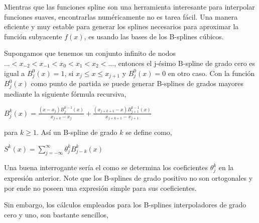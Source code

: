 \vspace{0.5cm}

\hspace{0.4cm} Mientras que las funciones spline son una herramienta interesante para interpolar funciones suaves, encontrarlas num\'ericamente no es tarea f\'acil. Una manera eficiente y muy estable para generar los splines necesarios para aproximar la funci\'on subyacente $f(x)$, es usando las bases de los B-splines c\'ubicos.

\vspace{0.5cm}

\hspace{0.4cm} Supongamos que tenemos un conjunto infinito de nodos $...<x_{-2}<x_{-1}<x_{0}<x_{1}<x_{2}<...$, entonces el j-\'esimo B-spline de grado cero es igual a $B^{0}_{j}(x)=1$, si $x_{j} \leq x \leq x_{j+1}$ y $B^{0}_{j}(x)=0$ en otro caso. Con la funci\'on $B^{0}_{j}(x)$ como punto de partida se puede generar B-splines de grados mayores mediante la siguiente f\'ormula recursiva,\\

\begin{center}

$\displaystyle{B^{k}_{j}(x) = \frac{(x-x_{j})B^{k-1}_{j}(x)}{x_{j+k}-x_{j}} + \frac{(x_{j+k+1}-x)B^{k-1}_{j+1}(x)}{x_{j+k+1}-x_{j+1}}}$
\end{center}

\vspace{0.5cm}

\noindent para $k\geq 1$. As\'i un B-spline de grado $k$ se define como,\\

\begin{center}

$\displaystyle{S^{k}(x) = \sum_{j=-\infty}^{\infty} \theta^{k}_{j} B^{k}_{j-k}(x)}$
\end{center}

\vspace{0.5cm}

\hspace{0.4cm} Una buena interrogante ser\'ia el como se determina los coeficientes $\theta^{k}_{j}$ en la expresi\'on anterior. Note que los B-splines de grado positivo no son ortogonales y por ende no poseen una expresi\'on simple para sus coeficientes.


Sin embargo, los c\'alculos empleados para los B-splines interpoladores de grado cero y uno, son bastante sencillos,\\

